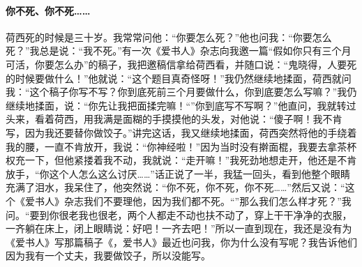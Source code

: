 \paragraph{你不死、你不死……}
\par 荷西死的时候是三十岁。我常常问他：“你要怎么死？”他也问我：“你要怎么死？”我总是说：“我不死。”有一次《爱书人》杂志向我邀一篇“假如你只有三个月可活，你要怎么办”的稿子，我把邀稿信拿给荷西看，并随口说：“鬼晓得，人要死的时候要做什么！”他就说：“这个题目真奇怪呀！”我仍然继续地揉面，荷西就问我：“这个稿子你写不写？你到底死前三个月要做什么，你到底要怎么写嘛？”我仍继续地揉面，说：“你先让我把面揉完嘛！“”你到底写不写啊？”他直问，我就转过头来，看着荷西，用我满是面糊的手摸摸他的头发，对他说：“傻子啊！我不肯写，因为我还要替你做饺子。”讲完这话，我又继续地揉面，荷西突然将他的手绕着我的腰，一直不肯放开，我说：“你神经啦！”因为当时没有擀面棍，我要去拿茶杯权充一下，但他紧搂着我不动，我就说：“走开嘛！”我死劲地想走开，他还是不肯放手，“你这个人怎么这么讨厌……”话正说了一半，我猛一回头，看到他整个眼睛充满了泪水，我呆住了，他突然说：“你不死，你不死，你不死……”然后又说：“这个《爱书人》杂志我们不要理他，因为我们都不死。“”那么我们怎么样才死？”我问。“要到你很老我也很老，两个人都走不动也扶不动了，穿上干干净净的衣服，一齐躺在床上，闭上眼睛说：好吧！一齐去吧！”所以一直到现在，我还是没有为《爱书人》写那篇稿子《，爱书人》最近也问我，你为什么没有写呢？我告诉他们因为我有一个丈夫，我要做饺子，所以没能写。

